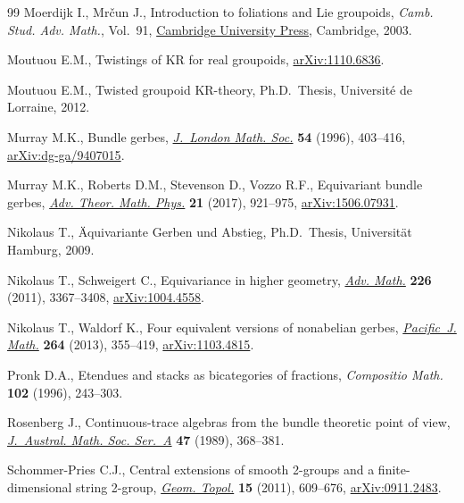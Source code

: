 \documentclass[10pt,a4paper]{amsart}
\numberwithin{equation}{section}
\begin{document}
\begin{thebibliography}{99}
Moerdijk I., Mr\v{c}un J., Introduction to foliations and {L}ie groupoids,
 \textit{Camb. Stud. Adv. Math.}, Vol.~91,
 \href{https://doi.org/10.1017/CBO9780511615450}{Cambridge University Press},
 Cambridge, 2003.

Moutuou E.M., Twistings of {KR} for real groupoids,
 \href{http://arxiv.org/abs/1110.6836}{arXiv:1110.6836}.

Moutuou E.M., Twisted groupoid {KR}-theory, Ph.D.~Thesis, {U}niversit\'e de
 Lorraine, 2012.

Murray M.K., Bundle gerbes,
 \href{https://doi.org/10.1093/acprof:oso/9780199534920.003.0012}{\textit{J.~London
 Math. Soc.}} \textbf{54} (1996), 403--416,
 \href{http://arxiv.org/abs/dg-ga/9407015}{arXiv:dg-ga/9407015}.

Murray M.K., Roberts D.M., Stevenson D., Vozzo R.F., Equivariant bundle gerbes,
 \href{https://doi.org/10.4310/ATMP.2017.v21.n4.a3}{\textit{Adv. Theor. Math.
 Phys.}} \textbf{21} (2017), 921--975,
 \href{http://arxiv.org/abs/1506.07931}{arXiv:1506.07931}.

Nikolaus T., \"Aquivariante {G}erben und {A}bstieg, Ph.D.~Thesis,
 {U}niversit\"at Hamburg, 2009.

Nikolaus T., Schweigert C., Equivariance in higher geometry,
 \href{https://doi.org/10.1016/j.aim.2010.10.016}{\textit{Adv. Math.}}
 \textbf{226} (2011), 3367--3408,
 \href{http://arxiv.org/abs/1004.4558}{arXiv:1004.4558}.

Nikolaus T., Waldorf K., Four equivalent versions of nonabelian gerbes,
 \href{https://doi.org/10.2140/pjm.2013.264.355}{\textit{Pacific~J. Math.}}
 \textbf{264} (2013), 355--419,
 \href{http://arxiv.org/abs/1103.4815}{arXiv:1103.4815}.

Pronk D.A., Etendues and stacks as bicategories of fractions,
 \textit{Compositio Math.} \textbf{102} (1996), 243--303.

Rosenberg J., Continuous-trace algebras from the bundle theoretic point of
 view, \href{https://doi.org/10.1017/S1446788700033097}{\textit{J.~Austral.
 Math. Soc. Ser.~A}} \textbf{47} (1989), 368--381.

Schommer-Pries C.J., Central extensions of smooth 2-groups and a
 finite-dimensional string 2-group,
 \href{https://doi.org/10.2140/gt.2011.15.609}{\textit{Geom. Topol.}}
 \textbf{15} (2011), 609--676,
 \href{http://arxiv.org/abs/0911.2483}{arXiv:0911.2483}.


\end{thebibliography}
\end{document}
